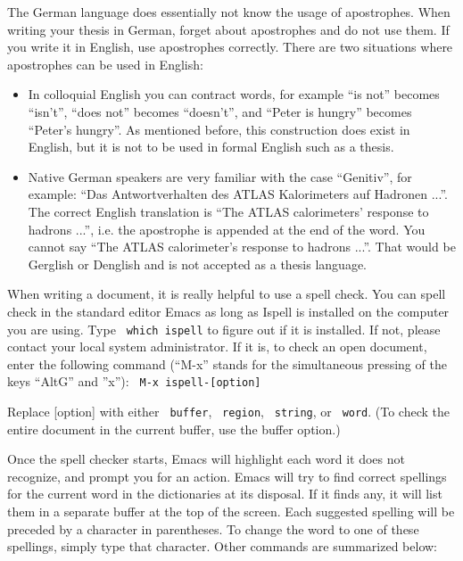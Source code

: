\documentclass[bachelor,       %
               twoside,        %
               BCOR10mm,       %
               ngerman,english  %
               ]{GAUBM}
\begin{document}
%
%
The German language does essentially not know the usage of
apostrophes. When writing your thesis in German, forget about
apostrophes and do not use them. If you write it in English, use
apostrophes correctly. There are two situations where apostrophes can
be used in English:
\begin{itemize}
\item In colloquial English you can contract words, for example ``is
  not'' becomes ``isn't'', ``does not'' becomes ``doesn't'', and
  ``Peter is hungry'' becomes ``Peter's hungry''. As mentioned before,
  this construction does exist in English, but it is not to be used in
  formal English such as a thesis.
\item Native German speakers are very familiar with the case
  ``Genitiv'', for example: ``Das Antwortverhalten des ATLAS
  Kalorimeters auf Hadronen ...''. The correct English translation is
  ``The ATLAS calorimeters' response to hadrons ...'', i.e. the
  apostrophe is appended at the end of the word. You cannot say ``The
  ATLAS calorimeter's response to hadrons ...''. That would be
  Gerglish or Denglish and is not accepted as a thesis language.
\end{itemize}

 
%
%
When writing a document, it is really helpful to use a spell check.
You can spell check in the standard editor Emacs as long as Ispell is
installed on the computer you are using. Type \texttt{ which ispell} to
figure out if it is installed. If not, please contact your local
system administrator. If it is, to check an open document, enter the
following command (``M-x'' stands for the simultaneous pressing of the
keys ``AltG'' and ''x''): \texttt{ M-x ispell-[option]}

Replace [option] with either \texttt{ buffer}, \texttt{ region}, \texttt{ string},
or \texttt{ word}. (To check the entire document in the current buffer,
use the buffer option.)

Once the spell checker starts, Emacs will highlight each word it does
not recognize, and prompt you for an action. Emacs will try to find
correct spellings for the current word in the dictionaries at its
disposal. If it finds any, it will list them in a separate buffer at
the top of the screen. Each suggested spelling will be preceded by a
character in parentheses. To change the word to one of these
spellings, simply type that character. Other commands are summarized
below: 
\end{document}
